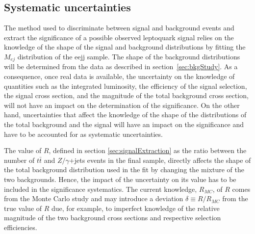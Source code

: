 \subsection{Systematic uncertainties}




The method used to discriminate between signal and background events and extract the significance 
of a possible observed leptoquark signal 
relies on the knowledge of the shape of the signal and background distributions 
by fitting the $M_{ej}$ distribution of the eejj sample.
The shape of the background distributions will be determined from the data as 
described in section~\ref{sec:bkgStudy}.
As a consequence, once real data is available, the uncertainty on the knowledge of quantities 
such as the integrated luminosity, the efficiency of the signal selection, the signal cross section, 
and the magnitude of the total background cross section, will not have an impact on the 
determination of the significance.
On the other hand, uncertainties that affect the knowledge of the shape of the distributions of 
the total background and the signal will have an impact on the significance and have to be 
accounted for as systematic uncertainties.

The value of $R$, defined in section \ref{sec:signalExtraction} as 
the ratio between the number of $t\bar{t}$ and $Z/\gamma$+jets events in the final sample,
directly affects the shape of the total background distribution used in the fit by changing the
mixture of the two backgrounds. 
Hence, the impact of the uncertainty on its value has to be included in the significance systematics.
The current knowledge, $R_{MC}$, of $R$ comes from the Monte Carlo
study and may introduce a deviation $\delta \equiv R/R_{MC}$ from the true value of $R$
due, for example, to imperfect knowledge of the relative magnitude of the two background 
cross sections and respective selection efficiencies.

